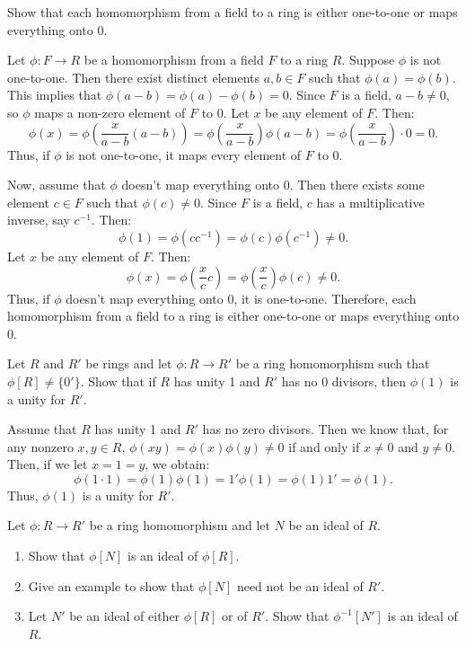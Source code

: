 \begin{problem}[30.18]
  Show that each homomorphism from a field to a ring is either one-to-one or maps everything onto 0.
\end{problem}

\begin{solution}
  Let $\phi : F \to R$ be a homomorphism from a field $F$ to a ring $R$. Suppose $\phi$ is not one-to-one. Then there exist distinct elements $a, b \in F$ such that $\phi(a) = \phi(b)$. This implies that $\phi(a - b) = \phi(a) - \phi(b) = 0$. Since $F$ is a field, $a - b \ne 0$, so $\phi$ maps a non-zero element of $F$ to $0$. Let $x$ be any element of $F$. Then:
  \[%
    \phi(x) = \phi\left(\frac{x}{a - b}(a - b)\right) = \phi\left(\frac{x}{a - b}\right)\phi(a - b) = \phi\left(\frac{x}{a - b}\right) \cdot 0 = 0
  .\]%
  Thus, if $\phi$ is not one-to-one, it maps every element of $F$ to $0$.

  Now, assume that $\phi$ doesn't map everything onto $0$. Then there exists some element $c \in F$ such that $\phi(c) \ne 0$. Since $F$ is a field, $c$ has a multiplicative inverse, say $c^{-1}$. Then:
  \[%
    \phi(1) = \phi(c c^{-1}) = \phi(c)\phi(c^{-1}) \ne 0
  .\]%
  Let $x$ be any element of $F$. Then:
  \[%
    \phi(x) = \phi\left(\frac{x}{c}c\right) = \phi\left(\frac{x}{c}\right)\phi(c) \ne 0
  .\]%
  Thus, if $\phi$ doesn't map everything onto $0$, it is one-to-one. Therefore, each homomorphism from a field to a ring is either one-to-one or maps everything onto $0$.
\end{solution}

\begin{problem}[30.21]
  Let $R$ and $R'$ be rings and let $\phi : R \to R'$ be a ring homomorphism such that $\phi[R] \ne \{0'\}$. Show that if $R$ has unity 1 and $R'$ has no 0 divisors, then $\phi(1)$ is a unity for $R'$.
\end{problem}

\begin{solution}
  Assume that $R$ has unity 1 and $R'$ has no zero divisors. Then we know that, for any nonzero $x, y \in R$, $\phi(xy) = \phi(x)\phi(y) \ne 0$ if and only if $x \ne 0$ and $y \ne 0$. Then, if we let $x = 1 = y$, we obtain:
  \[%
    \phi(1 \cdot 1) = \phi(1)\phi(1) = 1' \phi(1) = \phi(1) 1' = \phi(1)
  .\]%
  Thus, $\phi(1)$ is a unity for $R'$.
\end{solution}

\begin{problem}[30.22]
  Let $\phi : R \to R'$ be a ring homomorphism and let $N$ be an ideal of $R$.
  \begin{enumerate}
    \item Show that $\phi[N]$ is an ideal of $\phi[R]$.
    \item Give an example to show that $\phi[N]$ need not be an ideal of $R'$.
    \item Let $N'$ be an ideal of either $\phi[R]$ or of $R'$. Show that $\phi^{-1}[N']$ is an ideal of $R$.
  \end{enumerate}
\end{problem}

